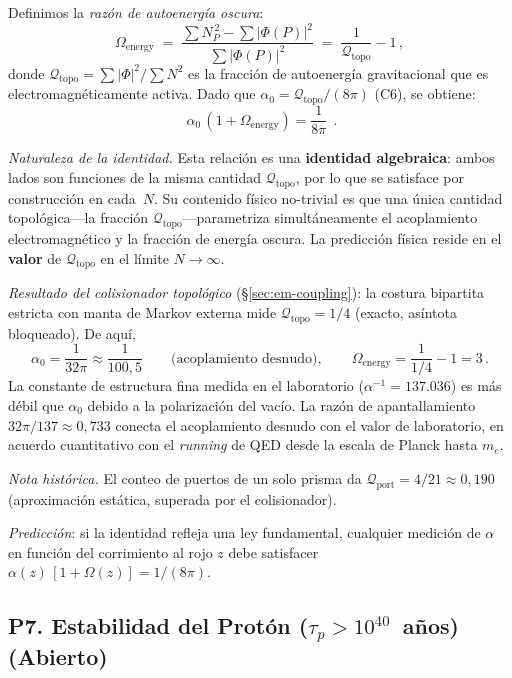 \documentclass[11pt, a4paper, openany]{book}
\begin{document}
Definimos la \emph{raz\'on de autoenerg\'ia oscura}:
\[
  \Omega_{\mathrm{energy}}
  \;=\; \frac{\sum N_P^{\,2} - \sum|\Phi(P)|^2}{\sum|\Phi(P)|^2}
  \;=\; \frac{1}{\mathcal{Q}_{\mathrm{topo}}} - 1\,,
\]
donde $\mathcal{Q}_{\mathrm{topo}} = \sum|\Phi|^2/\sum N^2$ es la
fracci\'on de autoenerg\'ia gravitacional que es electromagn\'eticamente
activa.  Dado que $\alpha_0 = \mathcal{Q}_{\mathrm{topo}}/(8\pi)$
(C6), se obtiene:
\[
  \boxed{\;\alpha_0\,(1 + \Omega_{\mathrm{energy}}) = \frac{1}{8\pi}\;\,.}
\]

\medskip\noindent
\textit{Naturaleza de la identidad.}\enspace
Esta relaci\'on es una \textbf{identidad algebraica}: ambos lados son
funciones de la misma cantidad $\mathcal{Q}_{\mathrm{topo}}$, por lo
que se satisface por construcci\'on en cada~$N$. Su contenido f\'isico
no-trivial es que una \'unica cantidad topol\'ogica---la fracci\'on
$\mathcal{Q}_{\mathrm{topo}}$---parametriza simult\'aneamente el
acoplamiento electromagn\'etico y la fracci\'on de energ\'ia oscura.
La predicci\'on f\'isica reside en el \textbf{valor} de
$\mathcal{Q}_{\mathrm{topo}}$ en el l\'imite $N \to \infty$.

\medskip\noindent
\textit{Resultado del colisionador topol\'ogico}
(\S\ref{sec:em-coupling}): la costura bipartita estricta con manta
de Markov externa mide $\mathcal{Q}_{\mathrm{topo}} = 1/4$ (exacto,
as\'intota bloqueado). De aqu\'i,
\[
  \alpha_0 = \frac{1}{32\pi} \approx \frac{1}{100{,}5}
  \qquad\text{(acoplamiento desnudo)},
  \qquad
  \Omega_{\mathrm{energy}} = \frac{1}{1/4} - 1 = 3\,.
\]
La constante de estructura fina medida en el laboratorio
($\alpha^{-1} = 137{.}036$) es m\'as d\'ebil que $\alpha_0$ debido a
la polarizaci\'on del vac\'io. La raz\'on de apantallamiento
$32\pi/137 \approx 0{,}733$ conecta el acoplamiento desnudo con el
valor de laboratorio, en acuerdo cuantitativo con el \emph{running}
de QED desde la escala de Planck hasta $m_e$.

\medskip\noindent
\textit{Nota hist\'orica.}\enspace
El conteo de puertos de un solo prisma da
$\mathcal{Q}_{\mathrm{port}} = 4/21 \approx 0{,}190$ (aproximaci\'on
est\'atica, superada por el colisionador).

\medskip\noindent
\textit{Predicci\'on}: si la identidad refleja una ley fundamental,
cualquier medici\'on de $\alpha$ en funci\'on del corrimiento al rojo
$z$ debe satisfacer $\alpha(z)\,[1 + \Omega(z)] = 1/(8\pi)$.

\subsection*{P7. Estabilidad del Prot\'on
  ($\tau_p > 10^{40}$~a\~nos) (Abierto)}
\label{open:proton-stability}
\end{document}
